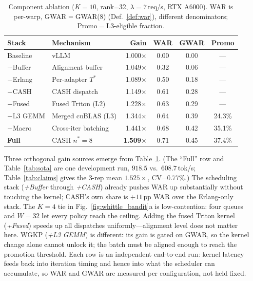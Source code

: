 \documentclass[conference]{IEEEtran}
\begin{document}
\begin{table}[!t]
\centering\footnotesize
\setlength{\tabcolsep}{4pt}
\caption{Component ablation ($K{=}10$, rank=32, $\lambda{=}7$\,req/s, RTX A6000).
  WAR is per-warp, GWAR${=}$GWAR(8) (Def.~\ref{def:war}), different denominators; Promo$=$L3-eligible fraction.}
\label{tab:ablation}
\begin{tabular}{@{}llrccc@{}}
\toprule
Stack & Mechanism & Gain & WAR & GWAR & Promo \\
\midrule
Baseline  & vLLM                  & 1.000$\times$ & 0.00 & 0.00 & --- \\
+Buffer   & Alignment buffer      & 1.049$\times$ & 0.32 & 0.06 & --- \\
+Erlang   & Per-adapter $T^*$     & 1.089$\times$ & 0.50 & 0.18 & --- \\
+CASH     & CASH dispatch         & 1.149$\times$ & 0.61 & 0.28 & --- \\
+Fused    & Fused Triton (L2)     & 1.228$\times$ & 0.63 & 0.29 & --- \\
+L3 GEMM  & Merged cuBLAS (L3)   & 1.344$\times$ & 0.64 & 0.39 & 24.3\% \\
+Macro    & Cross-iter batching   & 1.441$\times$ & 0.68 & 0.42 & 35.1\% \\
\textbf{Full} & CASH $n^*{=}8$   & \textbf{1.509$\times$} & 0.71 & 0.45 & 37.4\% \\
\bottomrule
\end{tabular}
\end{table}

Three orthogonal gain sources emerge from Table~\ref{tab:ablation}.
(The ``Full'' row and Table~\ref{tab:sota} are one development run, $918.5$ vs.\
$608.7$\,tok/s; Table~\ref{tab:claims} gives the 3-rep mean $1.525{\times}$, CV=0.77\%.)
The scheduling stack (\textit{+Buffer} through \textit{+CASH}) already pushes WAR
up substantially without touching the kernel; CASH's own share is $+11$\,pp WAR
over the Erlang-only stack.  The $K{=}4$ tie in Fig.~\ref{fig:whittle_bandit}a is
low-contention: four queues and $W{=}32$ let every policy reach the ceiling.
Adding the fused Triton kernel (\textit{+Fused}) speeds up all dispatches
uniformly---alignment level does not matter here.
WGKP (\textit{+L3 GEMM}) is different: its gain is gated on GWAR, so the kernel
change alone cannot unlock it; the batch must be aligned enough to reach the
promotion threshold.  Each row is an independent end-to-end run: kernel latency
feeds back into iteration timing and hence into what the scheduler can
accumulate, so WAR and GWAR are measured per configuration, not held fixed.
\end{document}

